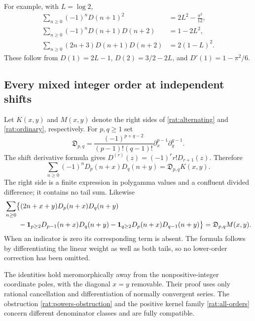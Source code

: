 \documentclass[11pt]{article}
\theoremstyle{definition}
\theoremstyle{remark}
\numberwithin{equation}{section}
\begin{document}
For example, with $L=\log2$,
\begin{align}
 \sum_{n\ge0}(-1)^nD(n+1)^2&=2L^2-\frac{\pi^2}{12},\label{rat:example1}\\
 \sum_{n\ge0}(-1)^nD(n+1)D(n+2)&=1-2L^2,\label{rat:example2}\\
 \sum_{n\ge0}(2n+3)D(n+1)D(n+2)&=2(1-L)^2.\label{rat:example3}
\end{align}
These follow from $D(1)=2L-1$, $D(2)=3/2-2L$, and
$D'(1)=1-\pi^2/6$.

\subsection{Every mixed integer order at independent shifts}

Let $K(x,y)$ and $M(x,y)$ denote the right sides of
\eqref{rat:alternating} and \eqref{rat:ordinary}, respectively.
For $p,q\ge1$ set
\[
 \mathfrak D_{p,q}=
 \frac{(-1)^{p+q-2}}{(p-1)!(q-1)!}
       \partial_x^{p-1}\partial_y^{q-1}.
\]
The shift derivative formula gives
$D^{(r)}(z)=(-1)^rr!D_{r+1}(z)$. Therefore
\begin{equation}\label{rat:all-orders}
 \boxed{\sum_{n\ge0}(-1)^nD_p(n+x)D_q(n+y)
                    =\mathfrak D_{p,q}K(x,y).}
\end{equation}
The right side is a finite expression in polygamma values and a
confluent divided difference; it contains no tail sum. Likewise
\begin{align}
 &\sum_{n\ge0}\bigl\{(2n+x+y)D_p(n+x)D_q(n+y)\notag\\
 &\qquad-\boldsymbol1_{p\ge2}D_{p-1}(n+x)D_q(n+y)
          -\boldsymbol1_{q\ge2}D_p(n+x)D_{q-1}(n+y)\bigr\}
            =\mathfrak D_{p,q}M(x,y).\label{rat:all-orders-ordinary}
\end{align}
When an indicator is zero its corresponding term is absent. The
formula follows by differentiating the linear weight as well as both
tails, so no lower-order correction has been omitted.

The identities hold meromorphically away from the nonpositive-integer
coordinate poles, with the diagonal $x=y$ removable. Their proof uses
only rational cancellation and differentiation of normally convergent
series. The obstruction \eqref{rat:powers-obstruction} and the positive
kernel family \eqref{rat:all-orders} concern different denominator
classes and are fully compatible.


\end{document}
